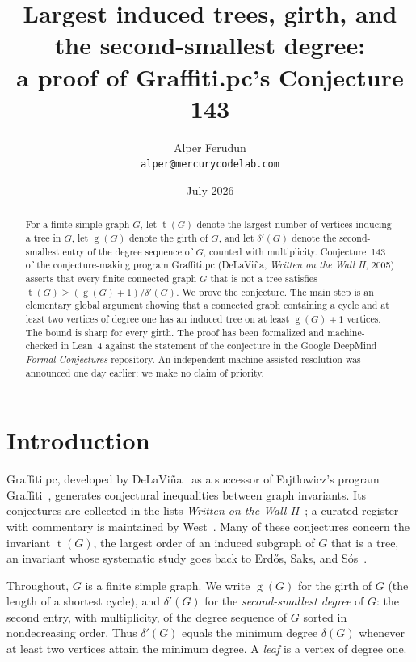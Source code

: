\documentclass[11pt]{article}
\title{Largest induced trees, girth, and the second-smallest degree:\\
a proof of Graffiti.pc's Conjecture 143}
\author{Alper Ferudun\\\texttt{alper@mercurycodelab.com}}
\date{July 2026}
\numberwithin{equation}{section}
\theoremstyle{remark}
\newcommand{\tr}{\operatorname{t}}
\newcommand{\gr}{\operatorname{g}}
\newcommand{\dd}{\delta'}
\begin{document}
\maketitle

\begin{abstract}
For a finite simple graph $G$, let $\tr(G)$ denote the largest number of
vertices inducing a tree in $G$, let $\gr(G)$ denote the girth of $G$, and let
$\dd(G)$ denote the second-smallest entry of the degree sequence of $G$,
counted with multiplicity.  Conjecture~143 of the conjecture-making program
Graffiti.pc (DeLaVi\~na, \emph{Written on the Wall II}, 2005) asserts that
every finite connected graph $G$ that is not a tree satisfies
$\tr(G)\ge(\gr(G)+1)/\dd(G)$.  We prove the conjecture.  The main step is an
elementary global argument showing that a connected graph containing a cycle
and at least two vertices of degree one has an induced tree on at least
$\gr(G)+1$ vertices.  The bound is sharp for every girth.  The proof has been
formalized and machine-checked in Lean~4 against the statement of the
conjecture in the Google DeepMind \emph{Formal Conjectures} repository.  An
independent machine-assisted resolution was announced one day earlier; we make
no claim of priority.
\end{abstract}

\section{Introduction}

Graffiti.pc, developed by DeLaVi\~na~\cite{DeL01,DeLhistory} as a successor of
Fajtlowicz's program Graffiti~\cite{Faj88}, generates conjectural inequalities
between graph invariants.  Its conjectures are collected in the lists
\emph{Written on the Wall II}~\cite{WOWII}; a curated register with commentary
is maintained by West~\cite{WestReg}.  Many of these conjectures concern the
invariant $\tr(G)$, the largest order of an induced subgraph of $G$ that is a
tree, an invariant whose systematic study goes back to Erd\H{o}s, Saks, and
S\'os~\cite{ESS86}.

Throughout, $G$ is a finite simple graph.  We write $\gr(G)$ for the girth of
$G$ (the length of a shortest cycle), and $\dd(G)$ for the \emph{second-smallest
degree} of $G$: the second entry, with multiplicity, of the degree sequence of
$G$ sorted in nondecreasing order.  Thus $\dd(G)$ equals the minimum degree
$\delta(G)$ whenever at least two vertices attain the minimum degree.  A
\emph{leaf} is a vertex of degree one.
\end{document}
